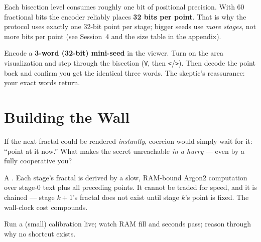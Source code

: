 \documentclass[a4paper,11pt]{report}
\newcommand{\probsoln}[3]{%
  \begin{description}[leftmargin=0pt,labelsep=0.5em,style=nextline]
    \item[\textcolor{attackcol}{Problem.}] #1
    \item[\textcolor{accent}{Solution.}] #2
    \item[\textcolor{modelcol}{Methodology.}] #3
  \end{description}}
\begin{document}

\begin{deeper}
Each bisection level consumes roughly one bit of positional precision. With 60
fractional bits the encoder reliably places \textbf{32 bits per point}. That is
why the protocol uses exactly one 32-bit point per stage; bigger seeds use
\emph{more stages}, not more bits per point (see Session~4 and the size table in
the appendix).
\end{deeper}

\begin{tryit}[In session]
Encode a \textbf{3-word (32-bit) mini-seed} in the viewer. Turn on the area
visualization and step through the bisection (\texttt{V}, then \texttt{<}/\texttt{>}).
Then decode the point back and confirm you get the identical three words. The
skeptic's reassurance: your exact words return.
\end{tryit}

\chapter{Building the Wall}

\probsoln
{If the next fractal could be rendered \emph{instantly}, coercion would simply
wait for it: ``point at it now.'' What makes the secret unreachable \emph{in a
hurry} — even by a fully cooperative you?}
{A \term{memory-hard chain}. Each stage's fractal is derived by a slow, RAM-bound
Argon2 computation over stage-0 text plus all preceding points. It cannot be
traded for speed, and it is chained — stage $k{+}1$'s fractal does not exist until
stage $k$'s point is fixed. The wall-clock cost compounds.}
{Run a (small) calibration live; watch RAM fill and seconds pass; reason through
why no shortcut exists.}
\end{document}
